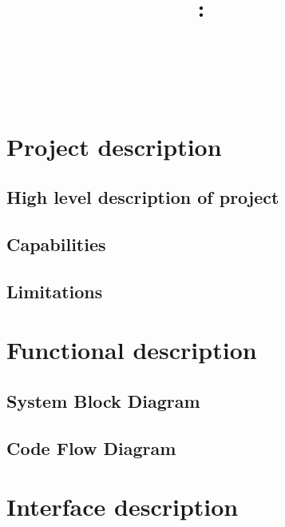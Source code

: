 \documentclass[11pt]{article}
\title{\vspace{2in}\textmd{\textbf{\hmwkClass:\ \hmwkTitle}}\\\normalsize\vspace{0.1in}\small{\hmwkDueDate}\\\vspace{0.1in}\large{\textit{\hmwkClassInstructor\ }}\vspace{3in}}
\date{}
\author{\textbf{\hmwkAuthorName}}
\begin{document}
\maketitle %
\newpage



\clearpage 
\section{Project description}
\subsection{High level description of project}
\subsection{Capabilities}
\subsection{Limitations}

\section{Functional description}
\subsection{System Block Diagram}
\subsection{Code Flow Diagram}

\section{Interface description}
\end{document}
